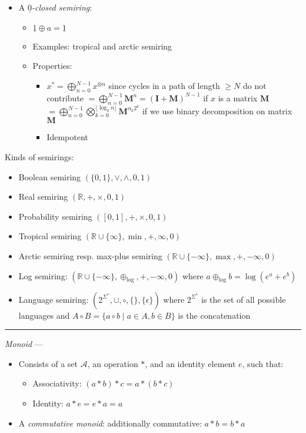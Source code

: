 \begin{itemize}
\begin{itemize}
    \end{itemize}
    \item A \emph{$\underline{0}$-closed semiring}:
    \begin{itemize}
        \item $\underline{1} \oplus a = \underline{1}$
        \item Examples: tropical and arctic semiring
        \item Properties:
        \begin{itemize}
            \item $
            x^* = \bigoplus_{n=0}^{N-1} x^{\otimes n}$ since cycles in a path of length $\geq N$ do not contribute  
            $= \bigoplus_{n=0}^{N-1} \boldsymbol{M}^n = ( \boldsymbol{I} + \boldsymbol{M})^{N-1}
            $ if $x$ is a matrix $\boldsymbol{M}$
            $
            = \bigoplus_{n=0}^{N-1} \bigotimes_{k=0}^{\lfloor \log_2 n \rfloor} \boldsymbol{M}^{\alpha_k2^k}
            $ if we use binary decomposition on matrix $\boldsymbol{M}$
            \item Idempotent
        \end{itemize}
    \end{itemize}
\end{itemize}
Kinds of semirings:
\begin{itemize}
    \item Boolean semiring $(\{0, 1\}, \lor, \land, 0, 1)$
    \item Real semiring $(\mathbb{R}, +, \times, 0, 1)$
    \item Probability semiring $([0, 1], +, \times, 0, 1)$
    \item Tropical semiring $(\mathbb{R} \cup \{\infty\}, \min, +, \infty, 0)$
    \item Arctic semiring resp. max-plus semiring $(\mathbb{R} \cup \{-\infty\}, \max, +, -\infty, 0)$
    \item Log semiring: $(\mathbb{R} \cup \{-\infty\}, \oplus_{\textrm{log}}, +, -\infty, 0)$ where $a \oplus_{\textrm{log}} b = \log(e^a + e^b)$
    \item Language semiring: $(2^{\Sigma^*}, \cup, \circ, \{\}, \{\epsilon\})$ where $2^{\Sigma^*}$ is the set of all possible languages and $A \circ B = \{a \circ b \mid a \in A, b \in B\}$ is the concatenation
\end{itemize}

{\color{lightgrey}\hrule height 0.001mm}

\emph{Monoid} ---
\begin{itemize}
    \item Consists of a set $\mathcal{A}$, an operation $*$, and an identity element $e$, such that:
    \begin{itemize}
        \item Associativity: $(a * b) * c = a * (b * c)$
        \item Identity: $a * e = e * a = a$
    \end{itemize}
    \item A \emph{commutative monoid}: additionally commutative: $a * b = b * a$
\end{itemize}